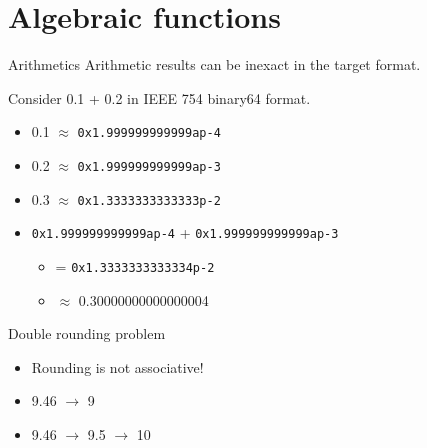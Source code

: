 \documentclass{beamer}
\begin{document}

\section{Algebraic functions}
\begin{frame}{Arithmetics}
    Arithmetic results can be inexact in the target format.
    
    \begin{example}
        Consider 0.1 + 0.2 in IEEE 754 binary64 format.

        \begin{itemize}
            \item 0.1 $\approx$ \texttt{0x1.999999999999ap-4}
            \item 0.2 $\approx$ \texttt{0x1.999999999999ap-3}
            \item 0.3 $\approx$ \texttt{0x1.3333333333333p-2}
            \item \texttt{0x1.999999999999ap-4} + \texttt{0x1.999999999999ap-3}
                \begin{itemize}
                    \item[] = \texttt{0x1.3333333333334p-2}
                    \item[] $\approx$ 0.30000000000000004
                \end{itemize}
        \end{itemize}
    \end{example}
\end{frame}

\begin{frame}{Double rounding problem}
    \begin{itemize}
        \item Rounding is not associative!
        \item 9.46 $\to$ 9
        \item 9.46 $\to$ 9.5 $\to$ 10
    \end{itemize}
\end{frame}
\end{document}
